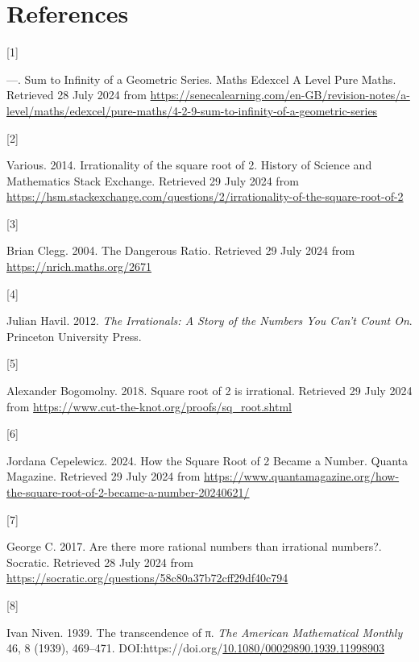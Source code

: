 \documentclass[
  a4paper,
]{article}
\newlength{\cslhangindent}
\newlength{\csllabelwidth}
\newenvironment{CSLReferences}[2] %
 {\begin{list}{}{%
  \setlength{\itemindent}{0pt}
  \setlength{\leftmargin}{0pt}
  \setlength{\parsep}{0pt}
  \ifodd #1
   \setlength{\leftmargin}{\cslhangindent}
   \setlength{\itemindent}{-1\cslhangindent}
  \fi
  \setlength{\itemsep}{#2\baselineskip}}}
 {\end{list}}
\newcommand{\CSLLeftMargin}[1]{\parbox[t]{\csllabelwidth}{\strut#1\strut}}
\newcommand{\CSLRightInline}[1]{\parbox[t]{\linewidth - \csllabelwidth}{\strut#1\strut}}
\begin{document}
\section*{References}\label{bibliography}

\label{refs}
\begin{CSLReferences}{0}{0}
\CSLLeftMargin{{[}1{]} }%
\CSLRightInline{---. {Sum to Infinity of a Geometric Series}. {Maths
Edexcel A Level Pure Maths}. Retrieved 28 July 2024 from
\url{https://senecalearning.com/en-GB/revision-notes/a-level/maths/edexcel/pure-maths/4-2-9-sum-to-infinity-of-a-geometric-series}}

\CSLLeftMargin{{[}2{]} }%
\CSLRightInline{Various. 2014. {Irrationality of the square root of 2}.
{History of Science and Mathematics Stack Exchange}. Retrieved 29 July
2024 from
\url{https://hsm.stackexchange.com/questions/2/irrationality-of-the-square-root-of-2}}

\CSLLeftMargin{{[}3{]} }%
\CSLRightInline{Brian Clegg. 2004. {The Dangerous Ratio}. Retrieved 29
July 2024 from \url{https://nrich.maths.org/2671}}

\CSLLeftMargin{{[}4{]} }%
\CSLRightInline{Julian Havil. 2012. \emph{{The Irrationals: A Story of
the Numbers You Can't Count On}}. Princeton University Press.}

\CSLLeftMargin{{[}5{]} }%
\CSLRightInline{Alexander Bogomolny. 2018. {Square root of 2 is
irrational}. Retrieved 29 July 2024 from
\url{https://www.cut-the-knot.org/proofs/sq_root.shtml}}

\CSLLeftMargin{{[}6{]} }%
\CSLRightInline{Jordana Cepelewicz. 2024. {How the Square Root of 2
Became a Number}. {Quanta Magazine}. Retrieved 29 July 2024 from
\url{https://www.quantamagazine.org/how-the-square-root-of-2-became-a-number-20240621/}}

\CSLLeftMargin{{[}7{]} }%
\CSLRightInline{George C. 2017. {Are there more rational numbers than
irrational numbers?}. {Socratic}. Retrieved 28 July 2024 from
\url{https://socratic.org/questions/58c80a37b72cff29df40c794}}

\CSLLeftMargin{{[}8{]} }%
\CSLRightInline{Ivan Niven. 1939. The transcendence of π. \emph{{The
American Mathematical Monthly}} 46, 8 (1939), 469--471.
DOI:https://doi.org/\href{https://doi.org/10.1080/00029890.1939.11998903}{10.1080/00029890.1939.11998903}}


\end{CSLReferences}
\end{document}
